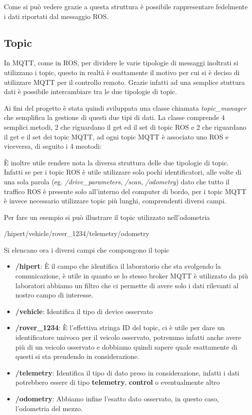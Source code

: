 \noindent Come si può vedere grazie a questa struttura è possibile rappresentare fedelmente i dati riportati dal messaggio ROS.

\subsection{Topic}
In MQTT, come in ROS, per dividere le varie tipologie di messaggi inoltrati si utilizzano i topic, questo in realtà è esattamente il motivo per cui si è deciso di utilizzare MQTT per il controllo remoto. Grazie infatti ad una semplice stuttura dati è possibile intercambiare tra le due tipologie di topic.

\noindent Ai fini del progetto è stata quindi sviluppata una classe chiamata \textit{topic\_manager} che semplifica la gestione di questi due tipi di dati. La classe comprende 4 semplici metodi, 2 che riguardano il get ed il set di topic ROS e 2 che riguardano il get e il set dei topic MQTT, ad ogni topic MQTT è associato uno ROS e viceversa, di seguito i 4 meotodi:



\noindent È inoltre utile rendere nota la diversa struttura delle due tipologie di topic. Infatti se per i topic ROS è utile utilizzare solo pochi identificatori, alle volte di una sola parola (eg. \textit{/drive\_parameters}, \textit{/scan}, \textit{/odometry}) dato che tutto il traffico ROS è presente solo all'interno del computer di bordo, per i topic MQTT è invece necessario utilizzare topic più lunghi, comprendenti diversi campi.

\noindent Per fare un esempio si può illustrare il topic utilizzato nell'odometria

\begin{center}
  /hipert/vehicle/rover\_1234/telemetry/odometry
\end{center}

\noindent Si elencano ora i diversi campi che compongono il topic

\begin{itemize}
  \item \textbf{/hipert}: È il campo che identifica il laboratorio che sta svolgendo la comunicazione, è utile in quanto se lo stesso broker MQTT è utilizzato da più laboratori abbiamo un filtro che ci permette di avere solo i dati rilevanti al nostro campo di interesse.
  \item \textbf{/vehicle}: Identifica il tipo di device osservato
  \item \textbf{/rover\_1234}: È l'effettiva stringa ID del topic, ci è utile per dare un identificatore univoco per il veicolo osservato, potremmo infatti anche avere più di un veicolo osservato e dobbiamo quindi sapere quale esattamente di questi si sta prendendo in considerazione.
  \item \textbf{/telemetry}: Identifica il tipo di dato preso in considerazione, infatti i dati potrebbero essere di tipo \textbf{telemetry}, \textbf{control} o eventualmente altro
  \item \textbf{/odometry}: Abbiamo infine l'esatto dato osservato, in questo caso, l'odometria del mezzo.
\end{itemize}
